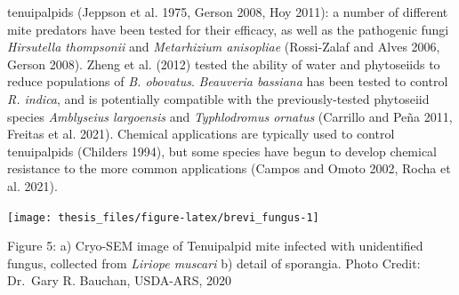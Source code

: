 \documentclass[12pt,final,CPage]{ufthesis}
\begin{document}
{tenuipalpids (Jeppson et al. 1975, Gerson 2008, Hoy 2011): a number of different mite predators have been tested for their efficacy, as well as the pathogenic fungi \emph{Hirsutella thompsonii} and \emph{Metarhizium anisopliae} (Rossi-Zalaf and Alves 2006, Gerson 2008). Zheng et al. (2012) tested the ability of water and phytoseiids to reduce populations of \emph{B. obovatus}. \emph{Beauveria bassiana} has been tested to control \emph{R. indica}, and is potentially compatible with the previously-tested phytoseiid species \emph{Amblyseius largoensis} and \emph{Typhlodromus ornatus} (Carrillo and Peña 2011, Freitas et al. 2021). Chemical applications are typically used to control tenuipalpids (Childers 1994), but some species have begun to develop chemical resistance to the more common applications (Campos and Omoto 2002, Rocha et al. 2021).
  \begin{center}\texttt{[image: thesis\_files/figure-latex/brevi\_fungus-1]} \end{center}

  Figure 5: a) Cryo-SEM image of Tenuipalpid mite infected with unidentified fungus, collected from \emph{Liriope muscari} b) detail of sporangia. Photo Credit: Dr.~Gary R. Bauchan, USDA-ARS, 2020

}
\end{document}
